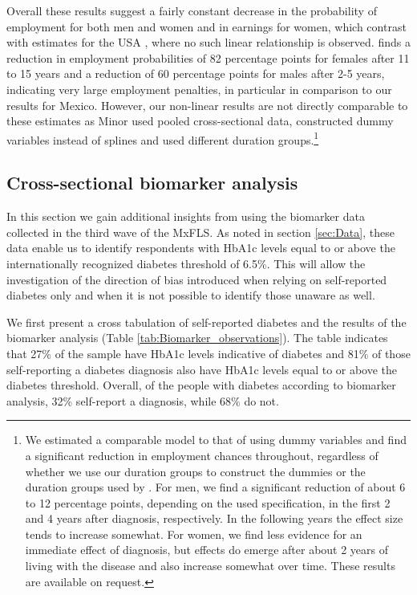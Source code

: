 Overall these results suggest a fairly constant decrease in the probability of employment for both men and women and in earnings for women, which contrast with estimates for the USA \parencite{Minor2013}, where no such linear relationship is observed.  \textcite{Minor2013} finds a reduction in employment probabilities of 82 percentage points for females after 11 to 15 years and a reduction of 60 percentage points for males after 2-5 years, indicating very large employment penalties, in particular in comparison to our results for Mexico. However, our non-linear results are not directly comparable to these estimates as Minor used pooled cross-sectional data, constructed dummy variables instead of splines and used different duration groups.\footnote{We estimated a comparable model to that of \textcite{Minor2013} using dummy variables and find a significant reduction in employment chances throughout, regardless of whether we use our duration groups to construct the dummies or the duration groups used by \textcite{Minor2013}. For men, we find a significant reduction of about 6 to 12 percentage points, depending on the used specification, in the first 2 and 4 years after diagnosis, respectively. In the following years the effect size tends to increase somewhat. For women, we find less evidence for an immediate effect of diagnosis, but effects do emerge after about 2 years of living with the disease and also increase somewhat over time. These results are available on request.}
\FloatBarrier

\subsection{Cross-sectional biomarker analysis}


In this section we gain additional insights from using the biomarker data collected in the
third wave of the \ac{MxFLS}. As noted in section \ref{sec:Data}, these data enable us to identify respondents with
\ac{HbA1c} levels equal to or above the internationally recognized diabetes threshold of 6.5\%. This will allow the investigation of the direction of bias introduced when relying on self-reported diabetes only and when it is not possible to identify those unaware as well.

We first present a cross tabulation of self-reported diabetes and the results of the biomarker analysis (Table  \ref{tab:Biomarker_observations}). The table indicates that 27\% of the sample have \ac{HbA1c} levels indicative of diabetes and 81\% of those self-reporting a diabetes diagnosis also have \ac{HbA1c} levels equal to or above the diabetes threshold. Overall, of the people with diabetes according to biomarker analysis, 32\% self-report a diagnosis, while 68\% do not.


